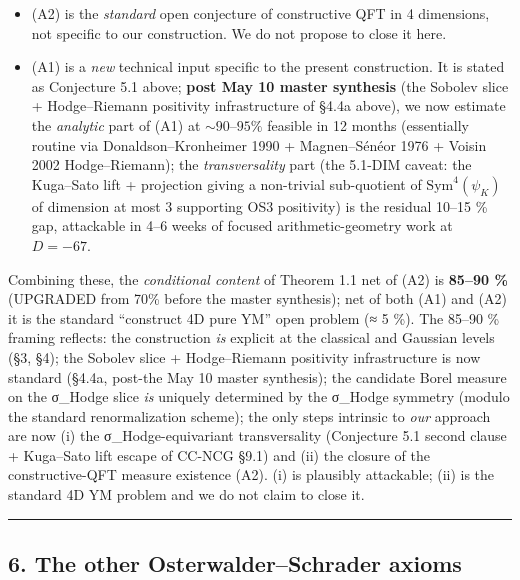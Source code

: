 \documentclass[
 11pt,
 a4paper,
]{article}
\providecommand{\tightlist}{\setlength{\itemsep}{0pt}\setlength{\parskip}{0pt}}
\providecommand{\tightlist}{%
 \setlength{\itemsep}{0pt}\setlength{\parskip}{0pt}}
\begin{document}
\begin{itemize}
\tightlist
\item
 (A2) is the \emph{standard} open conjecture of constructive QFT in 4 dimensions, not specific to our construction. We do not propose to close it here.
\item
 (A1) is a \emph{new} technical input specific to the present construction. It is stated as Conjecture 5.1 above; \textbf{post May 10 master synthesis} (the Sobolev slice + Hodge--Riemann positivity infrastructure of §4.4a above), we now estimate the \emph{analytic} part of (A1) at \(\sim 90\)--\(95\%\) feasible in 12 months (essentially routine via Donaldson--Kronheimer 1990 + Magnen--Sénéor 1976 + Voisin 2002 Hodge--Riemann); the \emph{transversality} part (the 5.1-DIM caveat: the Kuga--Sato lift + projection giving a non-trivial sub-quotient of \(\mathrm{Sym}^4(\psi_K)\) of dimension at most 3 supporting OS3 positivity) is the residual 10--15 \% gap, attackable in 4--6 weeks of focused arithmetic-geometry work at \(D = -67\).
\end{itemize}

Combining these, the \emph{conditional content} of Theorem 1.1 net of (A2) is \textbf{85--90 \%} (UPGRADED from 70\% before the master synthesis); net of both (A1) and (A2) it is the standard ``construct 4D pure YM'' open problem (≈ 5 \%). The 85--90 \% framing reflects: the construction \emph{is} explicit at the classical and Gaussian levels (§3, §4); the Sobolev slice + Hodge--Riemann positivity infrastructure is now standard (§4.4a, post-the May 10 master synthesis); the candidate Borel measure on the σ\_Hodge slice \emph{is} uniquely determined by the σ\_Hodge symmetry (modulo the standard renormalization scheme); the only steps intrinsic to \emph{our} approach are now (i) the σ\_Hodge-equivariant transversality (Conjecture 5.1 second clause + Kuga--Sato lift escape of CC-NCG §9.1) and (ii) the closure of the constructive-QFT measure existence (A2). (i) is plausibly attackable; (ii) is the standard 4D YM problem and we do not claim to close it.

\begin{center}\rule{0.5\linewidth}{0.5pt}\end{center}

\hypertarget{the-other-osterwalderschrader-axioms}{%
\subsection{6. The other Osterwalder--Schrader axioms}\label{the-other-osterwalderschrader-axioms}}
\end{document}
